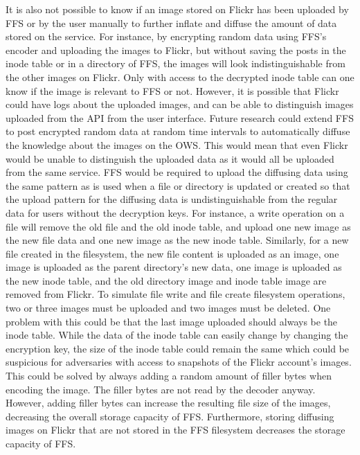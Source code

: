 It is also not possible to know if an image stored on Flickr has been uploaded by \gls{FFS} or by the user manually to further inflate and diffuse the amount of data stored on the service. For instance, by encrypting random data using \gls{FFS}'s encoder and uploading the images to Flickr, but without saving the posts in the inode table or in a directory of \gls{FFS}, the images will look indistinguishable from the other images on Flickr. Only with access to the decrypted inode table can one know if the image is relevant to \gls{FFS} or not. However, it is possible that Flickr could have logs about the uploaded images, and can be able to distinguish images uploaded from the \gls{API} from the user interface. Future research could extend \gls{FFS} to post encrypted random data at random time intervals to automatically diffuse the knowledge about the images on the \gls{OWS}. This would mean that even Flickr would be unable to distinguish the uploaded data as it would all be uploaded from the same service. \gls{FFS} would be required to upload the diffusing data using the same pattern as is used when a file or directory is updated or created so that the upload pattern for the diffusing data is undistinguishable from the regular data for users without the decryption keys. For instance, a write operation on a file will remove the old file and the old inode table, and upload one new image as the new file data and one new image as the new inode table. Similarly, for a new file created in the filesystem, the new file content is uploaded as an image, one image is uploaded as the parent directory's new data, one image is uploaded as the new inode table, and the old directory image and inode table image are removed from Flickr. To simulate file write and file create filesystem operations, two or three images must be uploaded and two images must be deleted. One problem with this could be that the last image uploaded should always be the inode table. While the data of the inode table can easily change by changing the encryption key, the size of the inode table could remain the same which could be suspicious for adversaries with access to snapshots of the Flickr account's images. This could be solved by always adding a random amount of filler bytes when encoding the image. The filler bytes are not read by the decoder anyway. However, adding filler bytes can increase the resulting file size of the images, decreasing the overall storage capacity of \gls{FFS}. Furthermore, storing diffusing images on Flickr that are not stored in the \gls{FFS} filesystem decreases the storage capacity of \gls{FFS}.

